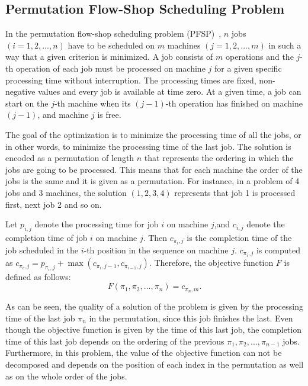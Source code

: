 \subsection{Permutation Flow-Shop Scheduling Problem}
In the permutation flow-shop scheduling problem (PFSP)~\citep{gupta2006flowshop, french1982sequencing, allahverdi2008survey}, $n$ jobs $(i = 1,2,...,n)$ have to be scheduled on $m$ machines $(j = 1,2,...,m)$ in such a way that a given criterion is minimized. A job consists of $m$ operations and the $j$-th operation of each job must be processed on machine $j$ for a given specific processing time without interruption. The processing times are fixed, non-negative values and every job is available at time zero. At a given time, a job can start on the $j$-th machine when its $(j-1)$-th operation has finished on machine $(j-1)$, and machine $j$ is free. 

The goal of the optimization is to minimize the processing time of all the jobs, or in other words, to minimize the processing time of the last job. The solution is encoded as a permutation of length $n$ that represents the ordering in which the jobs are going to be processed. This means that for each machine the order of the jobs is the same and it is given as a permutation. For instance, in a problem of 4 jobs and 3 machines, the solution $(1,2,3,4)$ represents that job 1 is processed first, next job 2 and so on.

Let $p_{i,j}$ denote the processing time for job $i$ on machine $j$,and $c_{i,j}$ denote the
completion time of job $i$ on machine $j$. Then $c_{\pi_{i},j}$ is the completion time of the job scheduled in the $i$-th position in the sequence on machine $j$. $c_{\pi_{i},j}$ is computed as $c_{\pi_{i},j} = p_{\pi_i,j} + \max{ (c_{\pi_{i},j-1},c_{\pi_{i-1},j}) }$. Therefore, the objective function $F$ is defined as follows:
\begin{equation*}
	F(\pi_1, \pi_2, ... , \pi_n) = c_{\pi_n,m} \text{.}
\end{equation*}

As can be seen, the quality of a solution of the problem is given by the processing time of the last job $\pi_n$ in the permutation, since this job finishes the last. Even though the objective function is given by the time of this last job, the completion time of this last job depends on the ordering of the previous $\pi_1, \pi_2, ... , \pi_{n-1}$ jobs. Furthermore, in this problem, the value of the objective function can not be decomposed and depends on the position of each index in the permutation as well as on the whole order of the jobs.


